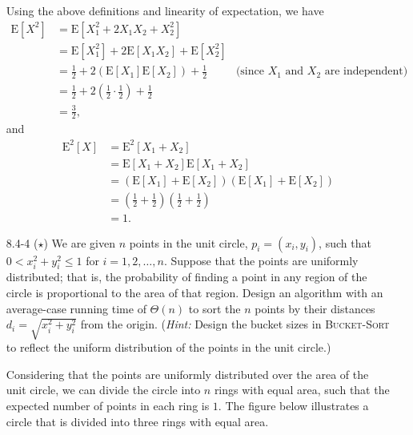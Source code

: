 \begin{enumerate}
\begin{framed}
Using the above definitions and linearity of expectation, we have
\begin{equation*}
\begin{aligned}
  \text{E}[X^2] &= \text{E}[X_1^2 + 2 X_1 X_2 + X_2^2]\\
                &= \text{E}[X_1^2] + 2 \text{E}[X_1 X_2] + \text{E}[X_2^2]\\
                &= \frac{1}{2} + 2 \left(\text{E}[X_1] \text{E}[X_2]\right) + \frac{1}{2} & \text{(since $X_1$ and $X_2$ are independent)}\\
                &= \frac{1}{2} + 2 \left(\frac{1}{2} \cdot \frac{1}{2}\right) + \frac{1}{2}\\
                &= \frac{3}{2},
\end{aligned}
\end{equation*}
and
\begin{equation*}
\begin{aligned}
  \text{E}^2[X] &= \text{E}^2[X_1 + X_2]\\
                &= \text{E}[X_1 + X_2] \text{E}[X_1 + X_2]\\
                &= ( \text{E}[X_1] + \text{E}[X_2] ) ( \text{E}[X_1] + \text{E}[X_2] )\\
                &= \left( \frac{1}{2} + \frac{1}{2} \right) \left( \frac{1}{2} + \frac{1}{2} \right)\\
                &= 1.
\end{aligned}
\end{equation*}
\end{framed}

\newpage

\item[8.4-4]{($\star$) We are given $n$ points in the unit circle,
$p_i = (x_i, y_i)$, such that $0 < x^2_i + y^2_i \le 1$ for
$i = 1, 2, \dots, n$. Suppose that the points are uniformly distributed; that
is, the probability of finding a point in any region of the circle is
proportional to the area of that region. Design an algorithm with an
average-case running time of $\Theta(n)$ to sort the $n$ points by their
distances $d_i = \sqrt{x^2_i + y^2_i}$ from the origin. (\emph{Hint:} Design the
bucket sizes in \textsc{Bucket-Sort} to reflect the uniform distribution of the
points in the unit circle.)}

\begin{framed}

Considering that the points are uniformly distributed over the area of the unit
circle, we can divide the circle into $n$ rings with equal area, such that the
expected number of points in each ring is $1$. The figure below illustrates
a circle that is divided into three rings with equal area.


\end{framed}
\end{enumerate}
